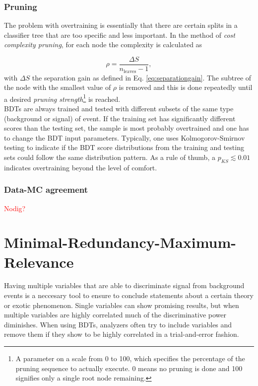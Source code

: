 \subsubsection{Pruning}
\label{subsub:pruning}
The problem with overtraining is essentially that there are certain splits in a classifier tree that are too specific and less important. In the method of \textit{cost complexity pruning}, for each node the complexity is calculated as

\begin{equation}
\rho = \frac{\Delta S}{n_{\textrm{leaves}} -1},
\end{equation}
\noindent with $\Delta S$ the separation gain as defined in Eq. \ref{eq:separationgain}. The subtree of the node with the smallest value of $\rho$ is removed and this is done repeatedly until a desired \textit{pruning strength}\footnote{A parameter on a scale from 0 to 100, which specifies the percentage of the pruning sequence to actually execute. 0 means no pruning is done and 100 signifies only a single root node remaining.} is reached.\\
\newline
\noindent BDTs are always trained and tested with different subsets of the same type (background or signal) of event. If the training set has significantly different scores than the testing set, the sample is most probably overtrained and one has to change the BDT input parameters. Typically, one uses Kolmogorov-Smirnov testing to indicate if the BDT score distributions from the training and testing sets could follow the same distribution pattern. As a rule of thumb, a $p_{KS} \lesssim 0.01$ indicates overtraining beyond the level of comfort.


\subsubsection{Data-MC agreement}
\textcolor{red}{Nodig?}	

\section{Minimal-Redundancy-Maximum-Relevance}
\label{sec:mrmr}
Having multiple variables that are able to discriminate signal from background events is a neccesary tool to ensure to conclude statements about a certain theory or exotic phenomenon. Single variables can show promising results, but when multiple variables are highly correlated much of the discriminative power diminishes. When using BDTs, analyzers often try to include variables and remove them if they show to be highly correlated in a trial-and-error fashion.

